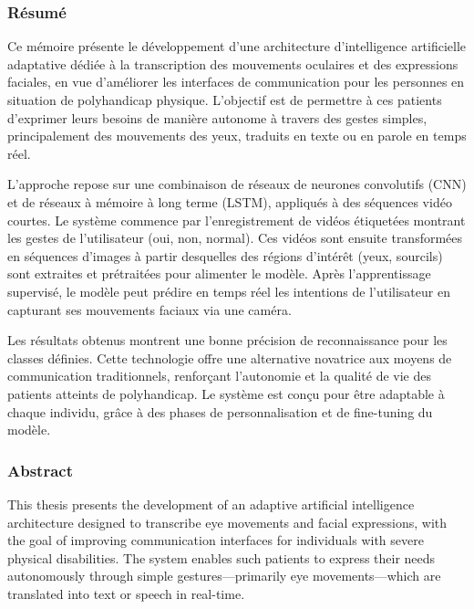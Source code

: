 \documentclass[
]{article}
\begin{document}
\hypertarget{ruxe9sumuxe9}{%
\subsubsection{Résumé}\label{ruxe9sumuxe9}}

Ce mémoire présente le développement d'une architecture d'intelligence artificielle adaptative {}dédiée à la transcription des mouvements oculaires et des expressions faciales, en vue d'améliorer les interfaces de communication pour les personnes en situation de polyhandicap physique. L'objectif est de permettre à ces patients d'exprimer leurs besoins de manière autonome à travers des gestes simples, principalement des mouvements des yeux, traduits en texte ou en parole en temps réel.

L'approche repose sur une combinaison de réseaux de neurones convolutifs (CNN) et de réseaux à mémoire à long terme (LSTM), appliqués à des séquences vidéo courtes. Le système commence par l'enregistrement de vidéos étiquetées montrant les gestes de l'utilisateur (oui, non, normal). Ces vidéos sont ensuite transformées en séquences d'images à partir desquelles des régions d'intérêt (yeux, sourcils) sont extraites et prétraitées pour alimenter le modèle. Après l'apprentissage supervisé, le modèle peut prédire en temps réel les intentions de l'utilisateur en capturant ses mouvements faciaux via une caméra.

Les résultats obtenus montrent une bonne précision de reconnaissance pour les classes définies. Cette technologie offre une alternative novatrice aux moyens de communication traditionnels, renforçant l'autonomie et la qualité de vie des patients atteints de polyhandicap. Le système est conçu pour être adaptable à chaque individu, grâce à des phases de personnalisation et de fine-tuning du modèle.

\hypertarget{abstract}{%
\subsubsection{Abstract}\label{abstract}}

This thesis presents the development of an adaptive artificial intelligence architecture designed to transcribe eye movements and facial expressions, with the goal of improving communication interfaces for individuals with severe physical disabilities. The system enables such patients to express their needs autonomously through simple gestures---primarily eye movements---which are translated into text or speech in real-time.
\end{document}
